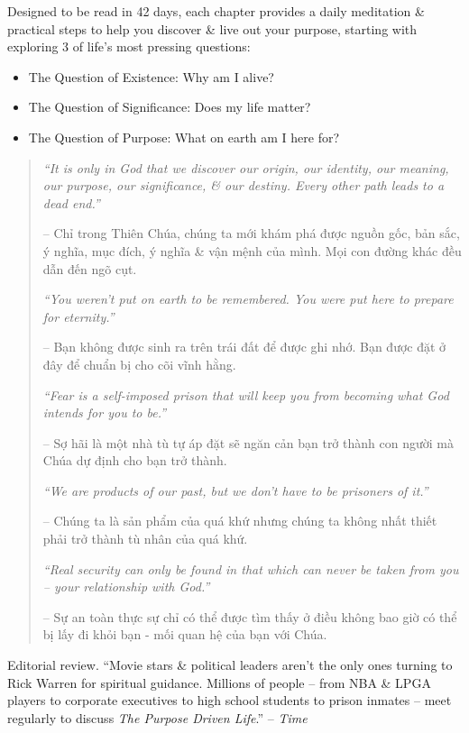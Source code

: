 \documentclass{article}
\begin{document}
\begin{enumerate}
	Designed to be read in 42 days, each chapter provides a daily meditation \& practical steps to help you discover \& live out your purpose, starting with exploring 3 of life's most pressing questions:
	\begin{itemize}
		\item The Question of Existence: Why am I alive?
		\item The Question of Significance: Does my life matter?
		\item The Question of Purpose: What on earth am I here for?
	\end{itemize}
	\begin{quotation}
		{\it``It is only in God that we discover our origin, our identity, our meaning, our purpose, our significance, \& our destiny. Every other path leads to a dead end.''}
		
		-- Chỉ trong Thiên Chúa, chúng ta mới khám phá được nguồn gốc, bản sắc, ý nghĩa, mục đích, ý nghĩa \& vận mệnh của mình. Mọi con đường khác đều dẫn đến ngõ cụt.
		
		{\it``You weren't put on earth to be remembered. You were put here to prepare for eternity.''}
		
		-- Bạn không được sinh ra trên trái đất để được ghi nhớ. Bạn được đặt ở đây để chuẩn bị cho cõi vĩnh hằng.
		
		{\it``Fear is a self-imposed prison that will keep you from becoming what God intends for you to be.''}
		
		-- Sợ hãi là một nhà tù tự áp đặt sẽ ngăn cản bạn trở thành con người mà Chúa dự định cho bạn trở thành.
		
		{\it``We are products of our past, but we don't have to be prisoners of it.''}
		
		-- Chúng ta là sản phẩm của quá khứ nhưng chúng ta không nhất thiết phải trở thành tù nhân của quá khứ.
		
		{\it``Real security can only be found in that which can never be taken from you -- your relationship with God.''}
		
		-- Sự an toàn thực sự chỉ có thể được tìm thấy ở điều không bao giờ có thể bị lấy đi khỏi bạn - mối quan hệ của bạn với Chúa.
	\end{quotation}
	{\sf Editorial review.} ``Movie stars \& political leaders aren't the only ones turning to {\sc Rick Warren} for spiritual guidance. Millions of people -- from NBA \& LPGA players to corporate executives to high school students to prison inmates -- meet regularly to discuss {\it The Purpose Driven Life}.'' -- {\it Time}
	

\end{enumerate}
\end{document}
